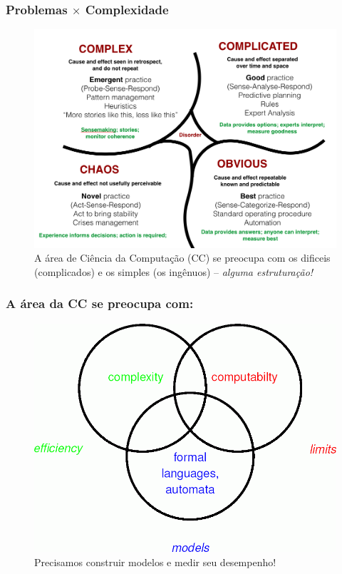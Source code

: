 \documentclass[10pt]{beamer}
\begin{document}
\begin{frame}[fragile]

\frametitle{Problemas $\times$ Complexidade}
\begin{figure}[!ht]
\centering
\includegraphics[height =.65\textheight,width=.8\textwidth]
{figuras/os_problemas.png}
\caption{A área de Ciência da Computação (CC) se preocupa com os  dificeis (complicados) e os simples (os ingênuos) -- \emph{alguma estruturação!}}
\end{figure}

\end{frame}


\begin{frame}[fragile]

\frametitle{A área da CC se preocupa com:}
\begin{figure}[!ht]
	\centering
	\includegraphics[height =.65\textheight,width=.8\textwidth]
	{figuras/modelos_complexidade_computabilidade.png}
	\caption{Precisamos construir modelos e medir seu desempenho!}
\end{figure}

\end{frame}
\end{document}
